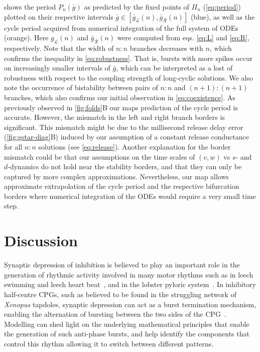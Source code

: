 \documentclass[utf8]{frontiersFPHY} %
\begin{document}
 shows the period $P_{n}(\bar g)$ as predicted by the fixed points of $\Pi_{n}$ (\cref{eq:period}) plotted on their respective intervals $\bar g \in [\bar g_{\mathcal{L}}(n),\bar g_{\mathcal{R}}(n)]$ (blue), as well as the cycle period acquired from numerical integration of the full system of ODEs (orange).
Here $g_{\mathcal{L}}(n)$ and $\bar g_{\mathcal{R}}(n)$ were computed from eqs. \ref{eq:L} and \ref{eq:R}, respectively.
Note that the width of $n:n$ branches decreases with $n$, which confirms the inequality in \cref{eq:robustness}.
That is, bursts with more spikes occur on increasingly smaller intervals of $\bar g$, which can be interpreted as a lost of robustness with respect to the coupling strength of long-cyclic solutions.
We also note the occurrence of bistability between pairs of $n:n$ and $(n+1):(n+1)$ branches, which also confirms our initial observation in
\cref{eq:coexistence}.
As previously observed in \cref{fig:folds}B our maps prediction of the cycle period is accurate.
However, the mismatch in the left and right branch borders is significant.
This mismatch might be due to the millisecond release delay error (\cref{fig:gstar-diag}B) induced by our assumption of a constant release conductance for all $n:n$ solutions (see \cref{eq:release}).
Another explanation for the border mismatch could be that our assumptions on the time scales of $(v,w)$ vs $s$- and $d$-dynamics do not hold near the stability borders, and that they can only be captured by more complex approximations.
Nevertheless, our map allows approximate extrapolation of the cycle period and the respective bifurcation borders where numerical integration of the ODEs would require a very small time step.

\section{Discussion}
Synaptic depression of inhibition is believed to play an important role in the generation of rhythmic activity involved in many motor rhythms such as in leech swimming \citep{mangan1994} and leech heart beat~\citep{calabrese1995}, and in the lobster pyloric system~\citep{manor1997, rabbah2007}.
In inhibitory half-centre CPGs, such as believed to be found in the struggling network of \textit{Xenopus} tapdoles,  synaptic depression can act as a burst termination mechanism, enabling the alternation of bursting between the two sides of the CPG~\citep{li2007}.
Modelling can shed light on the underlying mathematical principles that enable the generation of such anti-phase bursts, and help identify the components that control this rhythm allowing it to switch between different patterns.
\end{document}
